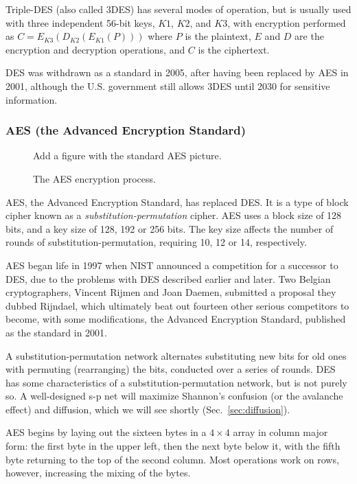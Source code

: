 Triple-DES (also called 3DES) has several modes of operation, but is
usually used with three independent 56-bit keys, $K1$, $K2$, and $K3$,
with encryption performed as $C = E_{K3}(D_{K2}(E_{K1}(P)))$ where $P$
is the plaintext, $E$ and $D$ are the encryption and decryption
operations, and $C$ is the ciphertext.

DES was withdrawn as a standard in 2005, after having been replaced by
AES in 2001, although the U.S. government still allows 3DES until 2030
for sensitive information. 

\subsubsection{AES (the Advanced Encryption Standard)}

\begin{figure}
  {\color{Magenta} Add a figure with the standard AES picture.}
  \caption{The AES encryption process.}
  \label{fig:aes}
\end{figure}

AES, the Advanced Encryption Standard, has replaced DES.  It is a type of block cipher known as a \emph{substitution-permutation} cipher.  AES uses a block size of 128 bits, and a key size of 128, 192 or 256 bits. The key size affects the number of rounds of substitution-permutation, requiring 10, 12 or 14, respectively.

AES began life in 1997 when NIST announced a competition for a successor to DES, due to the problems with DES described earlier and later. Two Belgian cryptographers, Vincent Rijmen and Joan Daemen, submitted a proposal they dubbed Rijndael, which ultimately beat out fourteen other serious competitors to become, with some modifications, the Advanced Encryption Standard, published as the standard in 2001.

A substitution-permutation network alternates substituting new bits
for old ones with permuting (rearranging) the bits, conducted over a
series of rounds. DES has some characteristics of a
substitution-permutation network, but is not purely so. A
well-designed s-p net will maximize Shannon's confusion (or the
avalanche effect) and diffusion, which we will see shortly
(Sec.~\ref{sec:diffusion}).

AES begins by laying out the sixteen bytes in a $4\times 4$ array in
column major form: the first byte in the upper left, then the next
byte below it, with the fifth byte returning to the top of the second
column. Most operations work on rows, however, increasing the mixing
of the bytes.

